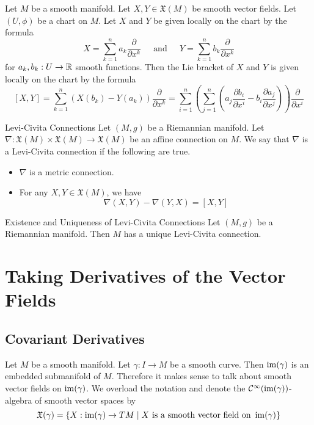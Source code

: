 \documentclass[a4paper]{article}
\begin{document}
\begin{prp}{}{} Let $M$ be a smooth manifold. Let $X,Y\in\mathfrak{X}(M)$ be smooth vector fields. Let $(U,\phi)$ be a chart on $M$. Let $X$ and $Y$ be given locally on the chart by the formula $$X=\sum_{k=1}^na_k\frac{\partial}{\partial x^k}\;\;\;\;\text{ and }\;\;\;\;Y=\sum_{k=1}^nb_k\frac{\partial}{\partial x^k}$$ for $a_k,b_k:U\to\mathbb{R}$ smooth functions. Then the Lie bracket of $X$ and $Y$ is given locally on the chart by the formula $$[X,Y]=\sum_{k=1}^n\left(X(b_k)-Y(a_k)\right)\frac{\partial}{\partial x^k}=\sum_{i=1}^n\left(\sum_{j=1}^n\left(a_j\frac{\partial b_i}{\partial x^i}-b_i\frac{\partial a_j}{\partial x^j}\right)\right)\frac{\partial}{\partial x^i}$$
\end{prp}

\begin{defn}{Levi-Civita Connections}{} Let $(M,g)$ be a Riemannian manifold. Let $\nabla:\mathfrak{X}(M)\times\mathfrak{X}(M)\to\mathfrak{X}(M)$ be an affine connection on $M$. We say that $\nabla$ is a Levi-Civita connection if the following are true. 
\begin{itemize}
\item $\nabla$ is a metric connection. 
\item For any $X,Y\in\mathfrak{X}(M)$, we have $$\nabla(X,Y)-\nabla(Y,X)=[X,Y]$$
\end{itemize}
\end{defn}

\begin{thm}{Existence and Uniqueness of Levi-Civita Connections}{} Let $(M,g)$ be a Riemannian manifold. Then $M$ has a unique Levi-Civita connection. 
\end{thm}

\pagebreak
\section{Taking Derivatives of the Vector Fields}
\subsection{Covariant Derivatives}
Let $M$ be a smooth manifold. Let $\gamma:I\to M$ be a smooth curve. Then $\operatorname{im}(\gamma)$ is an embedded submanifold of $M$. Therefore it makes sense to talk about smooth vector fields on $\operatorname{im}(\gamma)$. We overload the notation and denote the $\mathcal{C}^\infty(\operatorname{im}(\gamma))$-algebra of smooth vector spaces by $$\mathfrak{X}(\gamma)=\{X:\operatorname{im}(\gamma)\to TM\;|\;X\text{ is a smooth vector field on }\operatorname{im}(\gamma)\}$$
\end{document}
